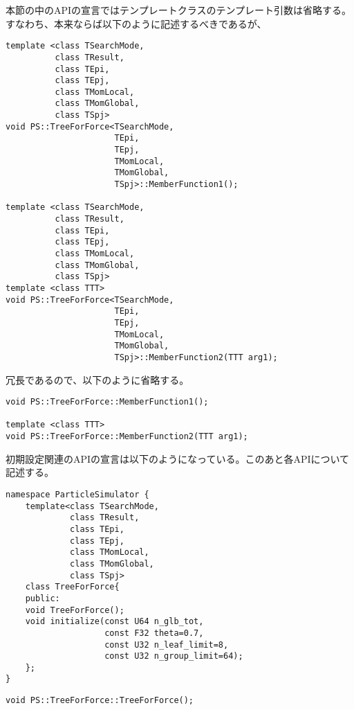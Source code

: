 本節の中のAPIの宣言ではテンプレートクラスのテンプレート引数は省略する。
すなわち、本来ならば以下のように記述するべきであるが、
\begin{screen}
\begin{verbatim}
template <class TSearchMode,
          class TResult,
          class TEpi,
          class TEpj,
          class TMomLocal,
          class TMomGlobal,
          class TSpj>
void PS::TreeForForce<TSearchMode,
                      TEpi,
                      TEpj,
                      TMomLocal,
                      TMomGlobal,
                      TSpj>::MemberFunction1();

template <class TSearchMode,
          class TResult,
          class TEpi,
          class TEpj,
          class TMomLocal,
          class TMomGlobal,
          class TSpj>
template <class TTT>
void PS::TreeForForce<TSearchMode,
                      TEpi,
                      TEpj,
                      TMomLocal,
                      TMomGlobal,
                      TSpj>::MemberFunction2(TTT arg1);
\end{verbatim}
\end{screen}
冗長であるので、以下のように省略する。
\begin{screen}
\begin{verbatim}
void PS::TreeForForce::MemberFunction1();

template <class TTT>
void PS::TreeForForce::MemberFunction2(TTT arg1);
\end{verbatim}
\end{screen}


初期設定関連のAPIの宣言は以下のようになっている。このあと各APIについて
記述する。
\begin{lstlisting}[caption=TreeForForce1]
namespace ParticleSimulator {
    template<class TSearchMode,
             class TResult,
             class TEpi,
             class TEpj,
             class TMomLocal,
             class TMomGlobal,
             class TSpj>
    class TreeForForce{
    public:
    void TreeForForce();
    void initialize(const U64 n_glb_tot,
                    const F32 theta=0.7,
                    const U32 n_leaf_limit=8,
                    const U32 n_group_limit=64);
    };
}
\end{lstlisting}


\begin{screen}
\begin{verbatim}
void PS::TreeForForce::TreeForForce();
\end{verbatim}
\end{screen}


